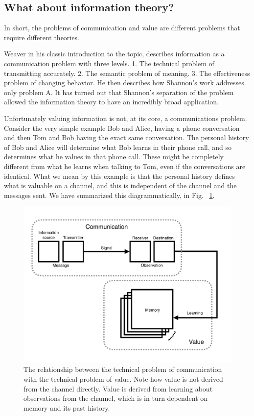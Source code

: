\subsection*{What about information theory?}
In short, the problems of communication and value are different problems that require different theories.

Weaver \citep{Shannon1948} in his classic introduction to the topic, describes information as a communication problem with three levels. 1. The technical problem of transmitting accurately. 2. The semantic problem of meaning. 3. The effectiveness problem of changing behavior. He then describes how Shannon's work addresses only problem A. It has turned out that Shannon's separation of the problem allowed the information theory to have an incredibly broad application. 

Unfortunately valuing information is not, at its core, a communications problem. Consider the very simple example Bob and Alice, having a phone conversation and then Tom and Bob having the exact same conversation. The personal history of Bob and Alice will determine what Bob learns in their phone call, and so determines what he values in that phone call. These might be completely different from what he learns when talking to Tom, even if the conversations are identical. What we mean by this example is that the personal history defines what is valuable on a channel, and this is independent of the channel and the messages sent. We have summarized this diagrammatically, in Fig. ~\ref{fig:info1}.

\begin{figure}
\begin{fullwidth}
	\includegraphics[width=0.6\linewidth]{img/info_diagram.pdf} 
    \caption{The relationship between the technical problem of communication with the technical problem of value. Note how value is not derived from the channel directly. Value is derived from learning about observations from the channel, which is in turn dependent on memory and its past history.
    }
    \label{fig:info1} 
\end{fullwidth}
\end{figure}

